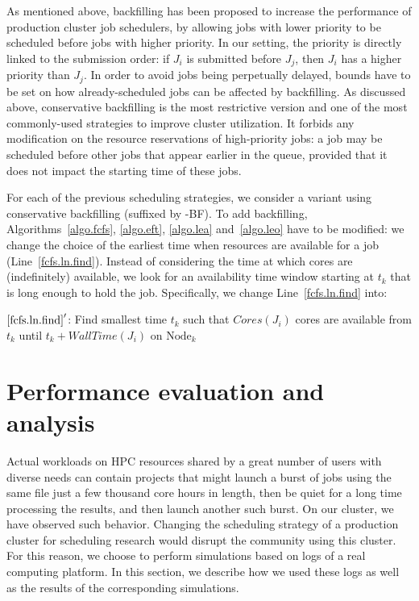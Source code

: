 \documentclass[conference]{IEEEtran}
\newcommand{\Node}[1]{\ensuremath{\mathrm{Node}_{#1}}\xspace}
\newcommand{\core}{\mathit{Cores}\xspace}
\newcommand{\walltime}{\mathit{WallTime}\xspace}
\begin{document}
As mentioned above, backfilling has been proposed to increase the
performance of production cluster job schedulers, by allowing jobs with lower priority to be
scheduled before jobs with higher priority. In our setting, the
priority is directly linked to the submission order: if $J_i$ is
submitted before $J_j$, then $J_i$ has a higher priority than $J_j$.
In order to avoid jobs
being perpetually delayed, bounds have to be set on how already-scheduled
jobs can be affected by backfilling. As discussed above,
conservative backfilling is the most restrictive version and one of
the most commonly-used strategies to improve cluster utilization. It
forbids any modification on the resource
reservations of high-priority jobs: a job may be scheduled
before other jobs that appear earlier in the queue, provided that it
does not impact the starting time of these jobs.


For each of the previous scheduling strategies, we consider a variant
using conservative backfilling (suffixed by -BF). To add
backfilling, Algorithms~\ref{algo.fcfs}, \ref{algo.eft},
\ref{algo.lea} and~\ref{algo.leo} have to be modified: we change the
choice of the earliest time when resources are available for a job
(Line~\ref{fcfs.ln.find}). Instead of considering the time at which
cores are (indefinitely) available, we look for an availability time
window starting at $t_k$ that is long enough to hold the
job. Specifically, we change Line~\ref{fcfs.ln.find} into:
\begin{algorithmic}[0]
  \State $\ref{fcfs.ln.find}'$: Find smallest time $t_k$ such that $\core(J_i)$ cores are
  available from $t_k$ until $t_k + \walltime(J_i)$ on $\Node{k}$
\end{algorithmic}


\section{Performance evaluation and analysis}\label{sec.evaluations}

Actual workloads on HPC resources shared by a great number of users with diverse needs can contain 
projects that might launch a burst of jobs using the same file just a few thousand
core hours in length, then be quiet for a long time processing the results, and then launch another such burst.
On our cluster, we have observed such behavior. %
Changing the scheduling strategy of a production cluster for
scheduling research would disrupt the community using this cluster.
For this reason, we choose to perform simulations based on logs of a
real computing platform. In this section, we describe how we used
these logs as well as the results of the corresponding simulations.
\end{document}
